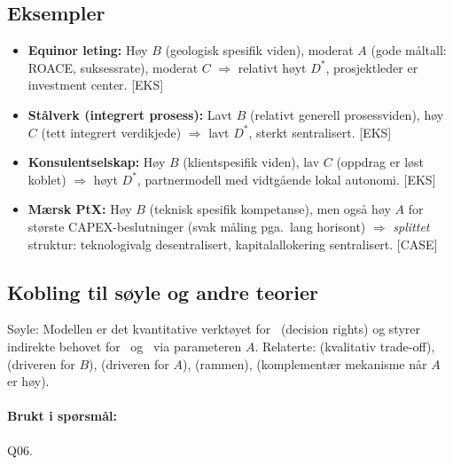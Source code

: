\subsection*{Eksempler}
\begin{itemize}\setlength{\itemsep}{2pt}
\item \textbf{Equinor leting:} Høy $B$ (geologisk spesifik viden), moderat $A$ (gode måltall: ROACE, suksessrate), moderat $C$ $\Rightarrow$ relativt høyt $D^*$, prosjektleder er investment center. [EKS]
\item \textbf{Stålverk (integrert prosess):} Lavt $B$ (relativt generell prosessviden), høy $C$ (tett integrert verdikjede) $\Rightarrow$ lavt $D^*$, sterkt sentralisert. [EKS]
\item \textbf{Konsulentselskap:} Høy $B$ (klientspesifik viden), lav $C$ (oppdrag er løst koblet) $\Rightarrow$ høyt $D^*$, partnermodell med vidtgående lokal autonomi. [EKS]
\item \textbf{Mærsk PtX:} Høy $B$ (teknisk spesifik kompetanse), men også høy $A$ for største CAPEX-beslutninger (svak måling pga.\ lang horisont) $\Rightarrow$ \emph{splittet} struktur: teknologivalg desentralisert, kapitalallokering sentralisert. [CASE]
\end{itemize}

\subsection*{Kobling til søyle og andre teorier}
Søyle: Modellen er det kvantitative verktøyet for \SOne\ (decision rights) og styrer indirekte behovet for \STwo\ og \SThree\ via parameteren $A$. Relaterte:  (kvalitativ trade-off),  (driveren for $B$),  (driveren for $A$),  (rammen),  (komplementær mekanisme når $A$ er høy).

\paragraph{Brukt i spørsmål:} Q06.
